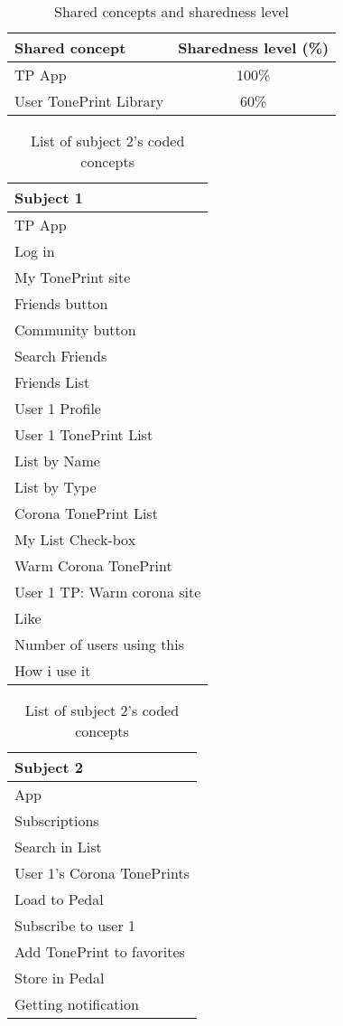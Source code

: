 \begin{table}[H]
	\centering
	\begin{tabular}[width=\textwidth]{|l|c|}
	\hline
	Shared concept & Sharedness level (\%) \\ \hline
	TP App & 100\% \\ 
	User TonePrint Library & 60\% \\ \hline
	\end{tabular}
	\caption{Shared concepts and sharedness level}
	\label{tab:SharedConcept}
\end{table}



\begin{table}[H]
\begin{minipage}[b]{0.5\linewidth}\centering

    \begin{tabular}{|l|}
    \hline
    Subject 1 \\ \hline
    TP App  \\
    Log in  \\
    My TonePrint site  \\
    Friends button  \\
    Community button  \\
    Search Friends  \\
    Friends List  \\
    User 1 Profile  \\
    User 1 TonePrint List  \\
    List by Name  \\
    List by Type  \\
    Corona TonePrint List  \\
    My List Check-box  \\
    Warm Corona TonePrint  \\
    User 1 TP: Warm corona site  \\
    Like  \\
    Number of users using this  \\
    How i use it  \\ \hline
    \end{tabular}
    \caption{List of subject 1's coded concepts}
    \label{tab:Subject1Coded}
    
	\begin{tabular}{|l|}
    \hline
    Subject 2 \\ \hline
    App \\
    Subscriptions  \\
    Search in List  \\
    User 1's Corona TonePrints  \\
    Load to Pedal  \\
    Subscribe to user 1  \\
    Add TonePrint to favorites  \\
    Store in Pedal  \\
    Getting notification  \\ \hline
    \end{tabular}
	\caption{List of subject 2's coded concepts}
    \label{tab:Subject2Coded}    
    

\end{minipage}
\end{table}
